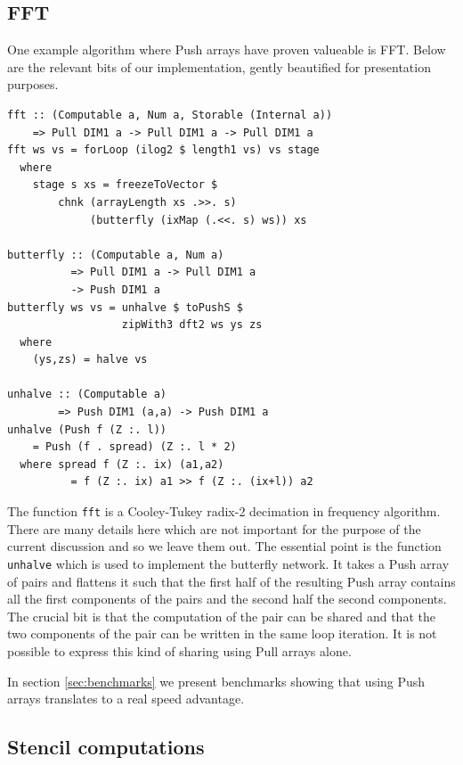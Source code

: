 \documentclass[preprint]{sigplanconf}
\begin{document}
\subsection{FFT}

\label{sec:fft}

One example algorithm where Push arrays have proven valueable is FFT.
Below are the relevant bits of our implementation, gently beautified for
presentation purposes.

\begin{verbatim}
fft :: (Computable a, Num a, Storable (Internal a))
    => Pull DIM1 a -> Pull DIM1 a -> Pull DIM1 a
fft ws vs = forLoop (ilog2 $ length1 vs) vs stage
  where
    stage s xs = freezeToVector $
        chnk (arrayLength xs .>>. s)
             (butterfly (ixMap (.<<. s) ws)) xs

butterfly :: (Computable a, Num a)
          => Pull DIM1 a -> Pull DIM1 a
          -> Push DIM1 a
butterfly ws vs = unhalve $ toPushS $ 
                  zipWith3 dft2 ws ys zs
  where
    (ys,zs) = halve vs

unhalve :: (Computable a)
        => Push DIM1 (a,a) -> Push DIM1 a
unhalve (Push f (Z :. l))
    = Push (f . spread) (Z :. l * 2)
  where spread f (Z :. ix) (a1,a2)
          = f (Z :. ix) a1 >> f (Z :. (ix+l)) a2
\end{verbatim}

The function \texttt{fft} is a Cooley-Tukey radix-2 decimation in
frequency algorithm. There are many details here which are not important
for the purpose of the current discussion and so we leave them out. The
essential point is the function \texttt{unhalve} which is used to
implement the butterfly network. It takes a Push array of pairs and
flattens it such that the first half of the resulting Push array
contains all the first components of the pairs and the second half the
second components. The crucial bit is that the computation of the pair
can be shared and that the two components of the pair can be written in
the same loop iteration. It is not possible to express this kind of
sharing using Pull arrays alone.

In section \ref{sec:benchmarks} we present benchmarks showing that using
Push arrays translates to a real speed advantage.

\subsection{Stencil computations}

\label{sec:stencil}
\end{document}
